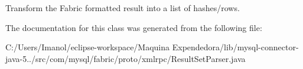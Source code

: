 Transform the Fabric formatted result into a list of hashes/rows. 

The documentation for this class was generated from the following file\+:\begin{DoxyCompactItemize}
\item 
C\+:/\+Users/\+Imanol/eclipse-\/workspace/\+Maquina Expendedora/lib/mysql-\/connector-\/java-\/5../src/com/mysql/fabric/proto/xmlrpc/Result\+Set\+Parser.\+java\end{DoxyCompactItemize}
